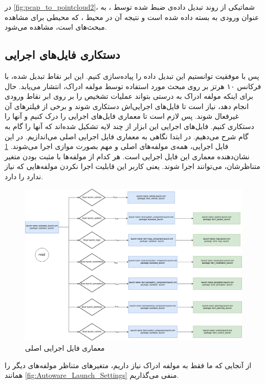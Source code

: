 در \cref{fig:pcap_to_pointcloud2}، شماتیکی از روند تبدیل داده‌ی  ضبط شده توسط ، به عنوان ورودی به بسته  داده شده است و نتیجه آن در محیط ، که محیطی برای مشاهده مبحث‌های  است، مشاهده می‌شود.

\subsection{دستکاری فایل‌های اجرایی }
پس با موفقیت توانستیم این تبدیل داده را پیاده‌سازی کنیم. این ابر نقاط تبدیل شده، با فرکانس ۱۰ هرتز بر روی مبحث مورد استفاده توسط مولفه ادراک، انتشار می‌یابد. حال برای اینکه مولفه ادراک به درستی بتواند عملیات تشخیص را بر روی ابر نقاط ورودی انجام دهد، نیاز است تا فایل‌های اجرایی‌اش دستکاری شوند و برخی از فیلتر‌های آن غیرفعال شوند. پس لازم است تا معماری فایل‌های اجرایی  را درک کنیم و آنها را دستکاری کنیم. فایل‌های اجرایی این ابزار از چند لایه تشکیل شده‌اند که آنها را گام به گام شرح می‌دهیم. در ابتدا نگاهی به معماری فایل اجرایی اصلی  می‌اندازیم. در این فایل اجرایی، همه‌ی مولفه‌های اصلی و مهم  بصورت موازی اجرا می‌شوند. \cref{fig:Autoware_Launch} نشان‌دهنده معماری این فایل اجرایی است. هر کدام از مولفه‌ها با مثبت بودن متغیر متناظرشان، می‌توانند اجرا شوند. یعنی کاربر این قابلیت اجرا نکردن مولفه‌هایی که نیاز ندارد را دارد.

\begin{figure}[h!]
    \centering
    \includegraphics[width=0.75\linewidth]{figures/autoware_launch.png}
    \caption{معماری فایل اجرایی اصلی }
    \label{fig:Autoware_Launch}
\end{figure}

از آنجایی که ما فقط به مولفه ادراک  نیاز داریم، متغیرهای متناظر مولفه‌های دیگر را همانند \cref{fig:Autoware_Launch_Settings} منفی می‌گذاریم.

